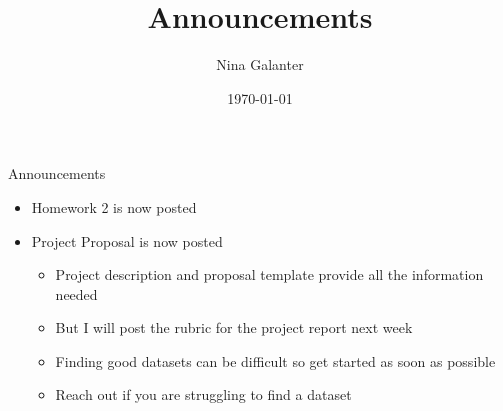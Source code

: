 \documentclass[10pt,t]{beamer}
\title{Announcements}
\author{Nina Galanter}
\date{\today}
\begin{document}


\begin{frame}{Announcements}
	
\begin{itemize}
	\item Homework 2 is now posted
	\medskip
	\item Project Proposal is now posted
	\medskip
	
	\begin{itemize}
	\item Project description and proposal template provide all the information needed
	\medskip
	\item But I will post the rubric for the project report next week
	\medskip
	
	\item Finding good datasets can be difficult so get started as soon as possible
	
	\medskip
	\item Reach out if you are struggling to find a dataset
	\end{itemize}
\end{itemize}
	
\end{frame}
\end{document}
